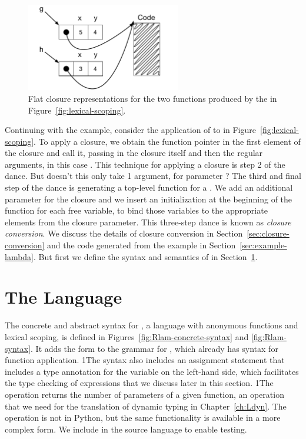 \documentclass[7x10,nocrop]{TimesAPriori_MIT}%
\def\pythonEd{1}
\def\edition{0}
\newcommand{\python}[1]{{\if\edition\pythonEd #1\fi}}
\begin{document}
\begin{figure}[tbp]
\centering \includegraphics[width=0.6\textwidth]{figs/closures}
\caption{Flat closure representations for the two functions
  produced by the  in Figure~\ref{fig:lexical-scoping}.}
\label{fig:closures}
\end{figure}

Continuing with the example, consider the application of  to
 in Figure~\ref{fig:lexical-scoping}.  To apply a closure, we
obtain the function pointer in the first element of the closure and
call it, passing in the closure itself and then the regular arguments,
in this case . This technique for applying a closure is step
2 of the dance.
%
But doesn't this  only take 1 argument, for parameter
? The third and final step of the dance is generating a
top-level function for a .  We add an additional
parameter for the closure and we insert an initialization at the beginning
of the function for each free variable, to bind those variables to the
appropriate elements from the closure parameter.
%
This three-step dance is known as \emph{closure conversion}.  We
discuss the details of closure conversion in
Section~\ref{sec:closure-conversion} and the code generated from the
example in Section~\ref{sec:example-lambda}. But first we define the
syntax and semantics of \LangLam{} in Section~\ref{sec:r5}.

\section{The \LangLam{} Language}
\label{sec:r5}

The concrete and abstract syntax for \LangLam{}, a language with anonymous
functions and lexical scoping, is defined in
Figures~\ref{fig:Rlam-concrete-syntax} and \ref{fig:Rlam-syntax}. It adds
the  form to the grammar for \LangFun{}, which already has
syntax for function application. 
%
\python{The syntax also includes an assignment statement that includes
  a type annotation for the variable on the left-hand side, which
  facilitates the type checking of \code{lambda} expressions that we
  discuss later in this section.}
%
\python{The  operation returns the number of parameters of
  a given function, an operation that we need for the translation
  of dynamic typing in Chapter~\ref{ch:Ldyn}.
  The \code{arity} operation is not in Python, but the same functionality
  is available in a more complex form. We include \code{arity} in the
  \LangLam{} source language to enable testing.}
\end{document}
